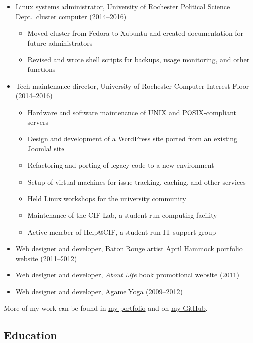 \documentclass[10pt]{article}
\begin{document}
\begin{itemize}
	\item Linux systems administrator, University of Rochester Political Science Dept.\ cluster computer (2014--2016)
		\begin{itemize}
			\item Moved cluster from Fedora to Xubuntu and created documentation for future administrators
			\item Revised and wrote shell scripts for backups, usage monitoring, and other functions
		\end{itemize}
	\item Tech maintenance director, University of Rochester Computer Interest Floor (2014--2016)
		\begin{itemize}
			\item Hardware and software maintenance of UNIX and POSIX-compliant servers
			\item Design and development of a WordPress site ported from an existing Joomla! site
			\item Refactoring and porting of legacy code to a new environment
			\item Setup of virtual machines for issue tracking, caching, and other services
			\item Held Linux workshops for the university community
			\item Maintenance of the CIF Lab, a student-run computing facility
			\item Active member of Help@CIF, a student-run IT support group
		\end{itemize}
	\item Web designer and developer, Baton Rouge artist \href{http://aprilhammockstudio.com}{April Hammock portfolio website} (2011--2012)
	\item Web designer and developer, \textit{About Life} book promotional website (2011)
	\item Web designer and developer, Agame Yoga (2009--2012)
\end{itemize}
\vspace{-0.75em}
More of my work can be found in \href{http://iamnatehart.com}{my portfolio} and on \href{https://github.com/nejsan}{my GitHub}.





\subsection*{Education}
\end{document}
